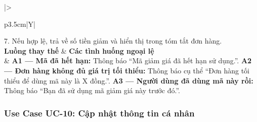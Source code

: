 \documentclass[11pt, a4paper]{article}
\begin{document}
\begin{table}[H]
\begin{tabularx}{\linewidth}{|>{\raggedright\arraybackslash}p{3.5cm}|Y|}
          7. Nếu hợp lệ, trả về số tiền giảm và hiển thị trong tóm tắt đơn hàng. \\ \hline
        \textbf{Luồng thay thế} & \textbf{Các tình huống ngoại lệ} \\ \hline
        & \textbf{A1 --- Mã đã hết hạn:} Thông báo ``Mã giảm giá đã hết hạn sử dụng.''. \newline
          \textbf{A2 --- Đơn hàng không đủ giá trị tối thiểu:} Thông báo cụ thể ``Đơn hàng tối thiểu để dùng mã này là X đồng.''. \newline
          \textbf{A3 --- Người dùng đã dùng mã này rồi:} Thông báo ``Bạn đã sử dụng mã giảm giá này trước đó.''. \\ \hline
    \end{tabularx}
\end{table}

\subsubsection{Use Case UC-10: Cập nhật thông tin cá nhân}
\end{document}
